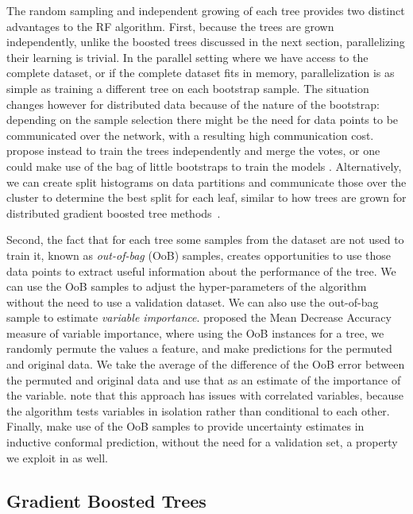 The random sampling and independent growing of each tree provides two distinct advantages
to the RF algorithm. First, because the trees are grown independently, unlike the boosted trees
discussed in the next section, parallelizing their learning is trivial. In the parallel
setting where we have access to the complete dataset, or if the complete dataset
fits in memory, parallelization is as simple as training a different tree on
each bootstrap sample. The situation changes
however for distributed data because of the nature of the bootstrap: depending
on the sample selection there might be the need for data points to be communicated
over the network, with a resulting high communication cost.
\citet{ensembles-bites} propose instead to train the trees independently
and merge the votes, or one could make use of the bag of little bootstraps
to train the models \cite{bag-of-boostraps}. Alternatively, we can create split
histograms on data partitions and communicate those over the cluster to determine the
best split for each leaf, similar to how trees are grown for distributed
gradient boosted tree methods~\cite{xgboost, lightgbm}.

Second, the fact that for each tree some samples from the dataset are not
used to train it, known as \emph{out-of-bag} (OoB) samples, creates opportunities
to use those data points to extract useful information about the performance
of the tree. We can use the OoB samples to adjust the hyper-parameters of the
algorithm without the need to use a validation dataset. We can also use
the out-of-bag sample to estimate \emph{variable importance}.
\citet{random-forests} proposed the Mean Decrease Accuracy measure of
variable importance, where using the OoB instances for a tree, we
randomly permute the values a feature, and make predictions
for the permuted and original data. We take the average
of the difference of the OoB error between the permuted
and original data and use that as an estimate of the importance
of the variable. \citet{random-forest-survey} note that this approach has issues with correlated variables, because the
algorithm tests variables in isolation rather than conditional
to each other.
Finally, \citet{johansson2013conformal} make use of the OoB samples to provide
uncertainty estimates in inductive conformal prediction, without the need for a
validation set, a property we exploit in \uncertaintrees as well.

\subsection{Gradient Boosted Trees}
\label{sec:bg-dt-gbts}

